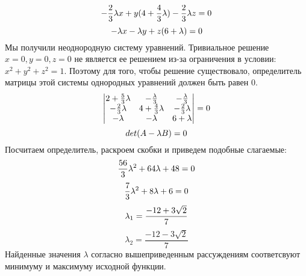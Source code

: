 \begin{solution}
\[    \]
    \[
        -\frac{2}{3}\lambda x + y(4+\frac{4}{3}\lambda)-\frac{2}{3}\lambda z=0\\
    \]
    \[
        -\lambda x - \lambda y + z(6+\lambda)=0\\
     \]
     Мы получили неоднородную систему уравнений. Тривиальное решение $x=0, y=0, z=0$ не является ее решением из-за ограничения в условии: $x^2+y^2+z^2=1$. Поэтому для того, чтобы решение существовало, определитель матрицы этой системы однородных уравнений должен быть равен $0$.
     \[
        \begin{vmatrix}
            2+\frac{5}{3}\lambda & -\frac{\lambda}{3} & -\frac{\lambda}{3}\\
            -\frac{2}{3}\lambda & 4+\frac{4}{3}\lambda & -\frac{2}{3}\lambda\\
            -\lambda & -\lambda & 6+\lambda
        \end{vmatrix} = 0\\
    \]
    \[
        det (A - \lambda B)=0 \\
     \]
     Посчитаем определитель, раскроем скобки и приведем подобные слагаемые:
     \[
        \frac{56}{3}\lambda^2 + 64\lambda+48=0\\
    \]
    \[
        \frac{7}{3}\lambda^2+8\lambda+6=0\\
    \]
    \[
        \lambda_1 = \frac{-12+3\sqrt{2}}{7}\\
    \]
    \[
        \lambda_2 = \frac{-12-3\sqrt{2}}{7}
     \]
    Найденные значения $\lambda$ согласно вышеприведенным рассуждениям соответсвуют минимуму и максимуму исходной функции.
\end{solution}